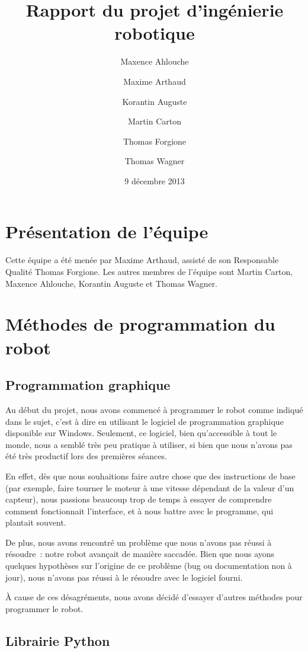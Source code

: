 \documentclass{scrartcl}
\author{Maxence Ahlouche \and Maxime Arthaud \and Korantin Auguste
  \and Martin Carton \and Thomas Forgione \and Thomas Wagner}
\title{Rapport du projet d'ingénierie robotique}
\date{9 décembre 2013}
\begin{document}
\maketitle
\tableofcontents
\newpage

\section{Présentation de l'équipe}
Cette équipe a été menée par Maxime Arthaud, assisté de son Responsable
Qualité Thomas Forgione. Les autres membres de l'équipe sont Martin Carton,
Maxence Ahlouche, Korantin Auguste et Thomas Wagner.

\section{Méthodes de programmation du robot}
\subsection{Programmation graphique}

Au début du projet, nous avons commencé à programmer le robot comme
indiqué dans le sujet, c'est à dire en utilisant le logiciel de programmation
graphique disponible sur Windows. Seulement, ce logiciel, bien
qu'accessible à tout le monde, nous a semblé très peu pratique %
à utiliser, si bien que nous n'avons pas été très productif lors des
premières séances.

En effet, dès que nous souhaitions faire autre
chose que des instructions de base (par exemple, faire tourner le
moteur à une vitesse dépendant de la valeur d'un capteur), nous
passions beaucoup trop de temps à essayer de comprendre comment fonctionnait
l'interface, et à nous battre avec le programme, qui plantait souvent.

De plus, nous avons rencontré un problème que nous n'avons pas réussi
à résoudre~: notre robot avançait de manière saccadée. Bien que nous ayons
quelques hypothèses sur l'origine de ce problème (bug ou documentation non à
jour), nous n'avons pas réussi à le résoudre avec le logiciel fourni.

À cause de ces désagréments, nous avons décidé d'essayer
d'autres méthodes pour programmer le robot.

\subsection{Librairie Python}
\end{document}
